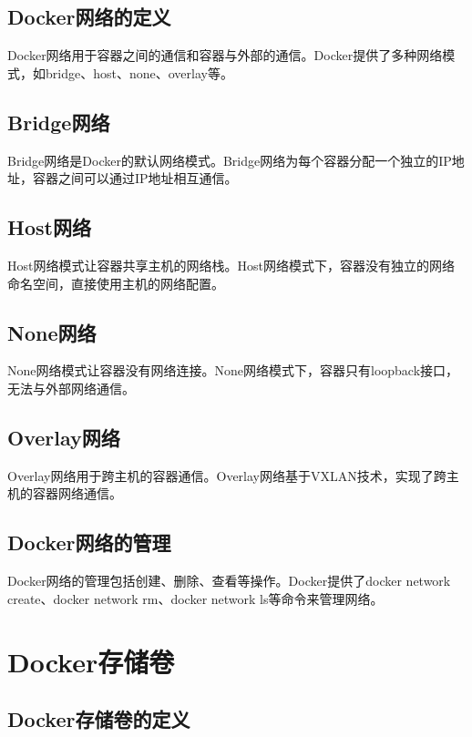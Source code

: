 \documentclass[12pt,UTF8]{ctexbook}
\begin{document}
\section{Docker网络的定义}

Docker网络用于容器之间的通信和容器与外部的通信。Docker提供了多种网络模式，如bridge、host、none、overlay等。

\section{Bridge网络}

Bridge网络是Docker的默认网络模式。Bridge网络为每个容器分配一个独立的IP地址，容器之间可以通过IP地址相互通信。

\section{Host网络}

Host网络模式让容器共享主机的网络栈。Host网络模式下，容器没有独立的网络命名空间，直接使用主机的网络配置。

\section{None网络}

None网络模式让容器没有网络连接。None网络模式下，容器只有loopback接口，无法与外部网络通信。

\section{Overlay网络}

Overlay网络用于跨主机的容器通信。Overlay网络基于VXLAN技术，实现了跨主机的容器网络通信。

\section{Docker网络的管理}

Docker网络的管理包括创建、删除、查看等操作。Docker提供了docker network create、docker network rm、docker network ls等命令来管理网络。

\chapter{Docker存储卷}

\section{Docker存储卷的定义}
\end{document}
